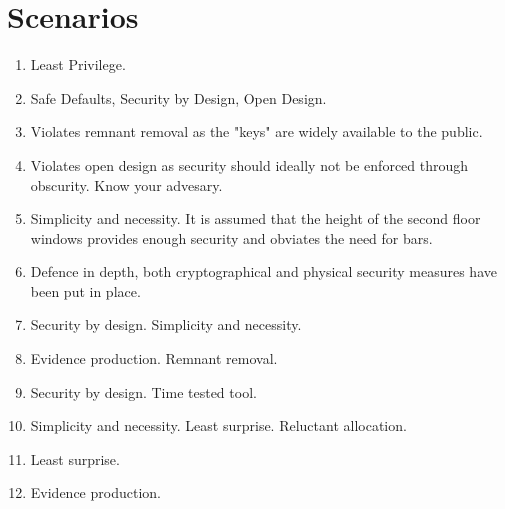 \documentclass{article}
\begin{document}
\section{Scenarios}

\begin{enumerate}

\item Least Privilege.
\item Safe Defaults, Security by Design, Open Design.
\item Violates remnant removal as the "keys" are widely available to the public. 
\item Violates open design as security should ideally not be enforced through obscurity. Know your advesary.
\item Simplicity and necessity. It is assumed that the height of the second floor windows provides enough security and obviates the need for bars.
\item Defence in depth, both cryptographical and physical security measures have been put in place. 


\item Security by design. Simplicity and necessity. 
\item Evidence production. Remnant removal. 
\item Security by design. Time tested tool.
\item Simplicity and necessity. Least surprise. Reluctant allocation.
\item Least surprise.
\item Evidence production.


\end{enumerate}
\end{document}
